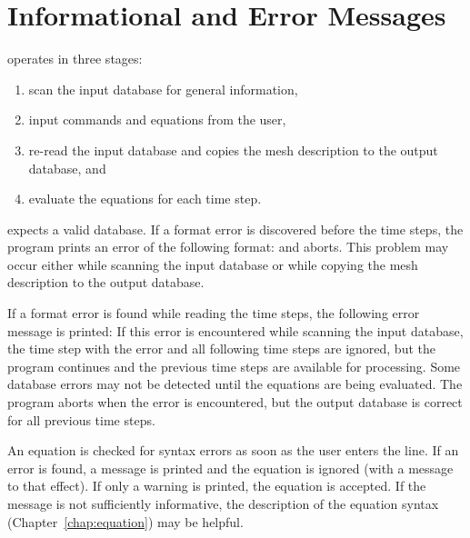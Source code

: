 \chapter{Informational and Error Messages} \label{chap:errmsg}

\caps{\PROGRAM} operates in three stages:

\begin{enumerate}

\item scan the input database for general information,

\item input commands and equations from the user,

\item re-read the input database and copies the mesh description to
  the output database, and

\item evaluate the equations for each time step.

\end{enumerate}

\caps{\PROGRAM} expects a valid database. If a format error is
discovered before the time steps, the program prints an error of the
following format:
and aborts. This problem may occur either while scanning the input
database or while copying the mesh description to the output database.

If a format error is found while reading the time steps, the following
error message is printed:
If this error is encountered while scanning the input database, the time
step with the error and all following time steps are ignored, but the
program continues and the previous time steps are available for
processing. Some database errors may not be detected until the equations
are being evaluated. The program aborts when the error is encountered,
but the output database is correct for all previous time steps.

An equation is checked for syntax errors as soon as the user enters the
line. If an error is found, a message is printed and the equation is
ignored (with a message to that effect). If only a warning is printed,
the equation is accepted. If the message is not sufficiently
informative, the description of the equation syntax
(Chapter~\ref{chap:equation}) may be helpful.

